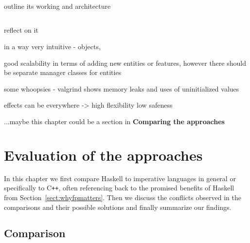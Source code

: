 \documentclass[
  digital, %
  color,   %
  table,   %
  oneside, %
  lof,     %
  lot,     %
]{fithesis3}
\newcommand{\cpp}{C\nolinebreak\texttt{+}\nolinebreak\texttt{+}}
\begin{document}
{\section{}
outline its working and architecture

\section{}
reflect on it

in a way very intuitive - objects, 

good scalability in terms of adding new entities or features,
however there should be separate manager classes for entities

some whoopsies - valgrind shows memory leaks and uses of uninitialized values

effects can be everywhere -> high flexibility low safeness

...maybe this chapter could be a section in \textbf{Comparing the approaches}






\chapter{Evaluation of the approaches}
\label{chptr:evaluation}

In this chapter we first compare Haskell to imperative languages in general or specifically to \cpp{},
often referencing back to the promised benefits of Haskell from Section~\ref{sect:whyfpmatters}.
Then we discuss the conflicts observed in the comparisons and their possible solutions
and finally summarize our findings.


\section{Comparison}

}
\end{document}
